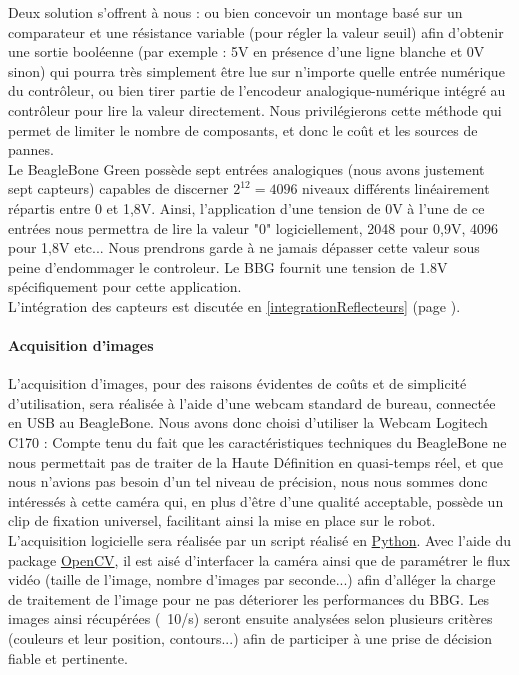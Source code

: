 			Deux solution s'offrent à nous : ou bien concevoir un montage basé sur un comparateur et une résistance variable (pour régler la valeur seuil) afin d'obtenir une sortie booléenne (par exemple : 5V en présence d'une ligne blanche et 0V sinon) qui pourra très simplement être lue sur n'importe quelle entrée numérique du contrôleur, ou bien tirer partie de l'encodeur analogique-numérique intégré au contrôleur pour lire la valeur directement. Nous privilégierons cette méthode qui permet de limiter le nombre de composants, et donc le coût et les sources de pannes.\\

			Le BeagleBone Green possède sept entrées analogiques (nous avons justement sept capteurs) capables de discerner $2^{12} = 4096$ niveaux différents linéairement répartis entre 0 et 1,8V\cite{bib6}.
			Ainsi, l'application d'une tension de 0V à l'une de ce entrées nous permettra de lire la valeur "0" logiciellement, 2048 pour 0,9V, 4096 pour 1,8V etc... Nous prendrons garde à ne jamais dépasser cette valeur sous peine d’endommager le controleur. Le BBG fournit une tension de 1.8V spécifiquement pour cette application\cite{bib6}.\\

			L'intégration des capteurs est discutée en \ref{integrationReflecteurs} (page \pageref{integrationReflecteurs}).

		\paragraph{Acquisition d'images}

			L'acquisition d'images, pour des raisons évidentes de coûts et  de simplicité d'utilisation, sera réalisée à l'aide d'une webcam standard de bureau, connectée en USB au BeagleBone. Nous avons donc choisi d'utiliser la Webcam Logitech C170 :
			Compte tenu du fait que les caractéristiques techniques du BeagleBone ne nous permettait pas de traiter de la Haute Définition en quasi-temps réel, et que nous n'avions pas besoin d'un tel niveau de précision, nous nous sommes donc intéressés à cette caméra qui, en plus d'être d'une qualité acceptable, possède un clip de fixation universel, facilitant ainsi la mise en place sur le robot. \\

			L'acquisition logicielle sera réalisée par un script réalisé en \href{https://www.python.org/}{Python}. Avec l'aide du package \href{https://www.http://opencv.org/}{OpenCV}, il est aisé d'interfacer la caméra ainsi que de paramétrer le flux vidéo (taille de l'image, nombre d'images par seconde...) afin d'alléger la charge de traitement de l'image pour ne pas déteriorer les performances du BBG. Les images ainsi récupérées (~10/s) seront ensuite analysées selon plusieurs critères (couleurs et leur position, contours...) afin de participer à une prise de décision fiable et pertinente.
			
